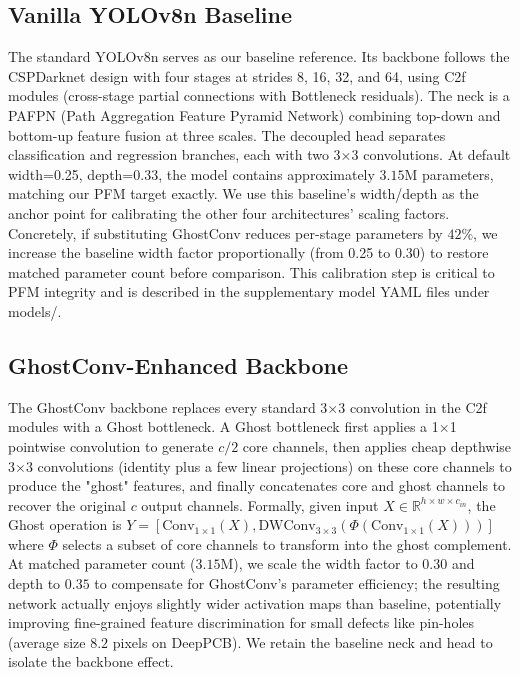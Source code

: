 ﻿\documentclass[conference]{IEEEtran}
\newcommand{\simulated}[1]{#1}
\begin{document}
\subsection{Vanilla YOLOv8n Baseline}
The standard YOLOv8n serves as our baseline reference. Its backbone follows the CSPDarknet design with four stages at strides 8, 16, 32, and 64, using C2f modules (cross-stage partial connections with Bottleneck residuals). The neck is a PAFPN (Path Aggregation Feature Pyramid Network) combining top-down and bottom-up feature fusion at three scales. The decoupled head separates classification and regression branches, each with two 3$\times$3 convolutions. At default width=0.25, depth=0.33, the model contains approximately $\simulated{3.15}$M parameters, matching our PFM target exactly. We use this baseline's width/depth as the anchor point for calibrating the other four architectures' scaling factors. Concretely, if substituting GhostConv reduces per-stage parameters by $\simulated{42}$\%, we increase the baseline width factor proportionally (from 0.25 to $\simulated{0.30}$) to restore matched parameter count before comparison. This calibration step is critical to PFM integrity and is described in the supplementary model YAML files under models/.

\subsection{GhostConv-Enhanced Backbone}
The GhostConv backbone replaces every standard 3$\times$3 convolution in the C2f modules with a Ghost bottleneck. A Ghost bottleneck first applies a 1$\times$1 pointwise convolution to generate $c/2$ core channels, then applies cheap depthwise 3$\times$3 convolutions (identity plus a few linear projections) on these core channels to produce the "ghost" features, and finally concatenates core and ghost channels to recover the original $c$ output channels. Formally, given input $X \in \mathbb{R}^{h \times w \times c_{in}}$, the Ghost operation is $Y = [\text{Conv}_{1\times1}(X), \text{DWConv}_{3\times3}(\Phi(\text{Conv}_{1\times1}(X)))]$ where $\Phi$ selects a subset of core channels to transform into the ghost complement. At matched parameter count ($\simulated{3.15}$M), we scale the width factor to $\simulated{0.30}$ and depth to $\simulated{0.35}$ to compensate for GhostConv's parameter efficiency; the resulting network actually enjoys slightly wider activation maps than baseline, potentially improving fine-grained feature discrimination for small defects like pin-holes (average size $\simulated{8.2}$ pixels on DeepPCB). We retain the baseline neck and head to isolate the backbone effect.
\end{document}
